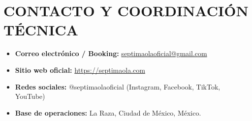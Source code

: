 \documentclass[a4paper,12pt]{article}
\newcommand{\sect}[1]{\section*{\normalfont\Large\bfseries\MakeUppercase{#1}}}
\begin{document}
\sect{Contacto y Coordinación Técnica}

\begin{itemize}[leftmargin=1.4em, itemsep=0.3em]
    \item \textbf{Correo electrónico / Booking:} \href{mailto:septimaolaoficial@gmail.com}{septimaolaoficial@gmail.com}
    \item \textbf{Sitio web oficial:} \href{https://septimaola.com}{https://septimaola.com}
    \item \textbf{Redes sociales:} @septimaolaoficial (Instagram, Facebook, TikTok, YouTube)
    \item \textbf{Base de operaciones:} La Raza, Ciudad de México, México.
\end{itemize}
\end{document}
